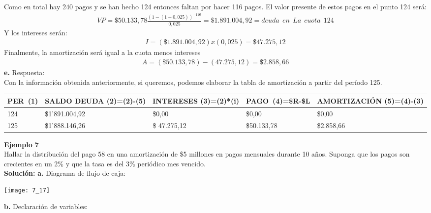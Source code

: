 Como en total hay 240 pagos y se han hecho 124 entonces faltan por hacer 116 pagos. El valor presente de estos pagos en el punto 124 será:
\begin{align*}
	VP = \$50.133,78 \frac{(1-(1+0,025))^{-116}}{0,025}=\$1.891. 004,92=deuda \ \ en\ \ La \ \ cuota \ \ 124
\end{align*}
Y los intereses serán:
\begin{align*}
	I=(\$1.891.004,92) x (0,025)= \$47.275,12
\end{align*}
Finalmente, la amortización será igual a la cuota menos intereses
\begin{align*}
	A=(\$50.133,78)-(47.275,12)=\$2.858,66
\end{align*}
\textbf{e.}	Respuesta:\\
Con la información obtenida anteriormente, si queremos, podemos elaborar la tabla de amortización a partir del período 125.
\begin{spacing}{1.1}
    \begin{center}
        \begin{tabular}{|p{1cm}|p{2cm}|p{2cm}|p{2cm}|p{3cm}|}
        \hline 
        \rowcolor{white!50}
            \textbf{PER\ (1)} & \textbf{SALDO DEUDA (2)=(2)-(5)} & \textbf{INTERESES  (3)=(2)*(i)}& \textbf{PAGO\ (4)=\$R-\$L }& \textbf{AMORTIZACIÓN  (5)=(4)-(3)} \\ \hline                        

            124 & \$1'891.004,92 & \$0,00 & \$0,00 & \$0,00\\ \hline 
            125 & \$1'888.146,26  &\$ 47.275,12  & \$50.133,78  & \$2.858,66 \\ \hline
            
\end{tabular}
\end{center}
\end{spacing}

\textbf{Ejemplo 7}\\
Hallar la distribución del pago 58 en una amortización de \$5 millones en pagos mensuales durante 10 años. Suponga que los pagos son crecientes en un 2\% y que la tasa es del 3\% periódico mes vencido. \\

\textbf{Solución:}
\textbf{a.}	Diagrama de flujo de caja:
\begin{center}
	\texttt{[image: 7\_17]}
\end{center}
\textbf{b.}	Declaración de variables:\\

